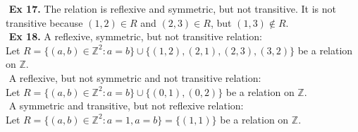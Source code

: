 \documentclass{article}
\begin{document}
$ $\newline
\noindent \textbf{Ex 17.} The relation is reflexive and symmetric, but not transitive. It is not transitive because $(1,2) \in R$ and $(2,3) \in R$, but $(1,3) \not\in R$.\\
$ $\newline
\noindent \textbf{Ex 18.}
\noindent A reflexive, symmetric, but not transitive relation:\\
Let $R= \{(a,b) \in \mathbb{Z}^2 : a = b\} \cup \{(1,2), (2,1), (2,3), (3,2)\}$ be a relation on $\mathbb{Z}$.\\
$ $\newline
A reflexive, but not symmetric and not transitive relation:\\
Let $R= \{(a,b) \in \mathbb{Z}^2 : a = b\} \cup \{(0,1), (0,2)\}$ be a relation on $\mathbb{Z}$.\\
$ $\newline
A symmetric and transitive, but not reflexive relation:\\
Let $R = \{(a,b) \in \mathbb{Z}^2 : a = 1, a = b\} = \{ (1,1) \}$ be a relation on $\mathbb{Z}$.
\end{document}
